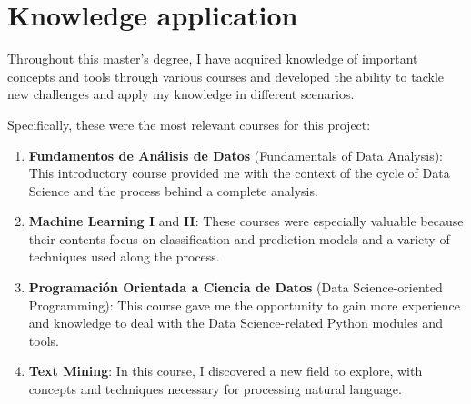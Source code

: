 \documentclass[a4paper, 12pt]{book}
\begin{document}




\section{Knowledge application}
\label{sec:knowledge-application}

Throughout this master's degree, I have acquired knowledge of important concepts and tools through various courses and developed the ability to tackle new challenges and apply my knowledge in different scenarios.

Specifically, these were the most relevant courses for this project:
\begin{enumerate}
\item \textbf{Fundamentos de Análisis de Datos} (Fundamentals of Data Analysis): This introductory course provided me with the context of the cycle of Data Science and the process behind a complete analysis.
\item \textbf{Machine Learning I} and \textbf{II}: These courses were especially valuable because their contents focus on classification and prediction models and a variety of techniques used along the process.
\item \textbf{Programación Orientada a Ciencia de Datos} (Data Science-oriented Programming): This course gave me the opportunity to gain more experience and knowledge to deal with the Data Science-related Python modules and tools.
\item \textbf{Text Mining}: In this course, I discovered a new field to explore, with concepts and techniques necessary for processing natural language.
\end{enumerate}
\end{document}
